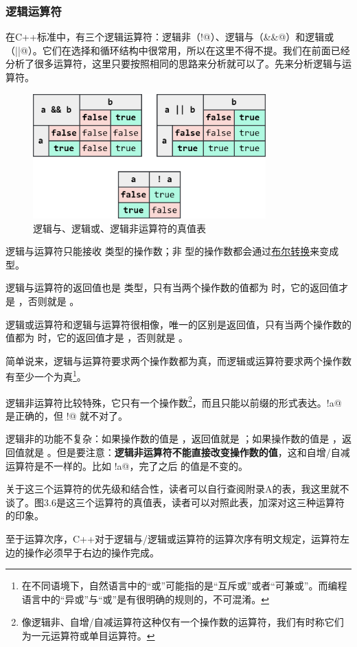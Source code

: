 \subsubsection*{逻辑运算符}
在C++标准中，有三个逻辑运算符：逻辑非（\lstinline@!@）、逻辑与（\lstinline@&&@）和逻辑或（\lstinline@||@）。它们在选择和循环结构中很常用，所以在这里不得不提。我们在前面已经分析了很多运算符，这里只要按照相同的思路来分析就可以了。先来分析逻辑与运算符。\par
\begin{figure}[htbp]
    \centering
    \includegraphics[width=0.8\textwidth]{../images/generalized_parts/03_truth_table_of_logic_operators.drawio.png}
    \caption{逻辑与、逻辑或、逻辑非运算符的真值表}
\end{figure}
逻辑与运算符只能接收 \lstinline@bool@ 类型的操作数；非 \lstinline@bool@ 型的操作数都会通过\hyperref[con:boolean_conversions]{布尔转换}来变成 \lstinline@bool@ 型。\par
逻辑与运算符的返回值也是 \lstinline@bool@ 类型，只有当两个操作数的值都为 \lstinline@true@ 时，它的返回值才是 \lstinline@true@，否则就是 \lstinline@false@。\par
逻辑或运算符和逻辑与运算符很相像，唯一的区别是返回值，只有当两个操作数的值都为 \lstinline@false@ 时，它的返回值才是 \lstinline@false@，否则就是 \lstinline@true@。\par
简单说来，逻辑与运算符要求两个操作数都为真，而逻辑或运算符要求两个操作数有至少一个为真\footnote{在不同语境下，自然语言中的``或''可能指的是``互斥或''或者``可兼或''。而编程语言中的``异或''与``或''是有很明确的规则的，不可混淆。}。\par
逻辑非运算符比较特殊，它只有一个操作数\footnote{像逻辑非、自增/自减运算符这种仅有一个操作数的运算符，我们有时称它们为一元运算符或单目运算符。}，而且只能以前缀的形式表达。\lstinline@!a@ 是正确的，但 \lstinline@a!@ 就不对了。\par
逻辑非的功能不复杂：如果操作数的值是 \lstinline@true@，返回值就是 \lstinline@false@；如果操作数的值是 \lstinline@false@，返回值就是 \lstinline@true@。但是要注意：\textbf{逻辑非运算符不能直接改变操作数的值}，这和自增/自减运算符是不一样的。比如 \lstinline@!a@，完了之后 \lstinline@a@ 的值是不变的。\par
关于这三个运算符的优先级和结合性，读者可以自行查阅附录A的表，我这里就不谈了。图3.6是这三个运算符的真值表，读者可以对照此表，加深对这三种运算符的印象。\par
至于运算次序，C++对于逻辑与/逻辑或运算符的运算次序有明文规定，运算符左边的操作必须早于右边的操作完成。\par
